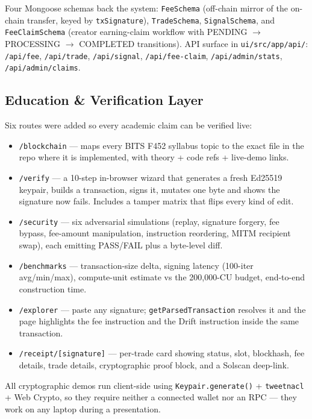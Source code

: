 \documentclass[11pt,a4paper]{article}
\begin{document}
Four Mongoose schemas back the system: \texttt{FeeSchema} (off-chain mirror of the on-chain transfer, keyed by \texttt{txSignature}), \texttt{TradeSchema}, \texttt{SignalSchema}, and \texttt{FeeClaimSchema} (creator earning-claim workflow with PENDING $\rightarrow$ PROCESSING $\rightarrow$ COMPLETED transitions). API surface in \texttt{ui/src/app/api/}: \texttt{/api/fee}, \texttt{/api/trade}, \texttt{/api/signal}, \texttt{/api/fee-claim}, \texttt{/api/admin/stats}, \texttt{/api/admin/claims}.

\subsection{Education \& Verification Layer}

Six routes were added so every academic claim can be verified live:

\begin{itemize}
    \item \texttt{/blockchain} --- maps every BITS F452 syllabus topic to the exact file in the repo where it is implemented, with theory + code refs + live-demo links.
    \item \texttt{/verify} --- a 10-step in-browser wizard that generates a fresh Ed25519 keypair, builds a transaction, signs it, mutates one byte and shows the signature now fails. Includes a tamper matrix that flips every kind of edit.
    \item \texttt{/security} --- six adversarial simulations (replay, signature forgery, fee bypass, fee-amount manipulation, instruction reordering, MITM recipient swap), each emitting PASS/FAIL plus a byte-level diff.
    \item \texttt{/benchmarks} --- transaction-size delta, signing latency (100-iter avg/min/max), compute-unit estimate vs the 200{,}000-CU budget, end-to-end construction time.
    \item \texttt{/explorer} --- paste any signature; \texttt{getParsedTransaction} resolves it and the page highlights the fee instruction and the Drift instruction inside the same transaction.
    \item \texttt{/receipt/[signature]} --- per-trade card showing status, slot, blockhash, fee details, trade details, cryptographic proof block, and a Solscan deep-link.
\end{itemize}

All cryptographic demos run client-side using \texttt{Keypair.generate()} + \texttt{tweetnacl} + Web Crypto, so they require neither a connected wallet nor an RPC --- they work on any laptop during a presentation.
\end{document}

